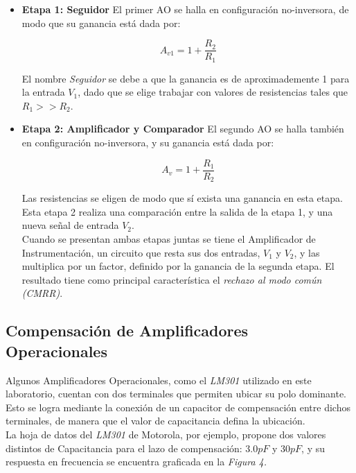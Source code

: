 \documentclass[letterpaper, 10 pt, conference]{ieeeconf}  %
\begin{document}
\begin{itemize}
\item \textbf{Etapa 1: Seguidor} El primer AO se halla en configuración no-inversora, de modo que su ganancia está dada por:

            \begin{equation}
            A_{v1} =1 + \frac{R_2}{R_1}
            \end{equation}

El nombre \textit{Seguidor} se debe a que la ganancia es de aproximademente 1 para la entrada $V_1$, dado que se elige trabajar con valores de resistencias tales que $R_1 >> R_2$. \\

\item \textbf{Etapa 2: Amplificador y Comparador} El segundo AO se halla también en configuración no-inversora, y su ganancia está dada por:

            \begin{equation}
            A_v =1 + \frac{R_1}{R_2}
            \label{eq11}
            \end{equation}

Las resistencias se eligen de modo que sí exista una ganancia en esta etapa. \\
Esta etapa 2 realiza  una comparación entre la salida de la etapa 1, y una nueva señal de entrada $V_2$. \\

Cuando se presentan ambas etapas juntas se tiene el Amplificador de Instrumentación, un circuito que resta sus dos entradas, $V_1$ y $V_2$, y las multiplica por un factor, definido por la ganancia de la segunda etapa.
El resultado tiene como principal característica el \textit{rechazo al modo común (CMRR)}.



\end{itemize}



\subsection{Compensación de Amplificadores Operacionales}
Algunos Amplificadores Operacionales, como el \textit{LM301} utilizado en este laboratorio, cuentan con dos terminales que permiten ubicar su polo dominante.
Esto se logra mediante la conexión de un capacitor de compensación entre dichos terminales, de manera que el valor de capacitancia defina la ubicación. \\
La hoja de datos del\textit{ LM301} de Motorola, por ejemplo, propone dos valores distintos de Capacitancia para el lazo de compensación: $3.0 pF$ y $30 pF$, y su respuesta en frecuencia se encuentra graficada en la \textit{Figura 4.}
\end{document}
